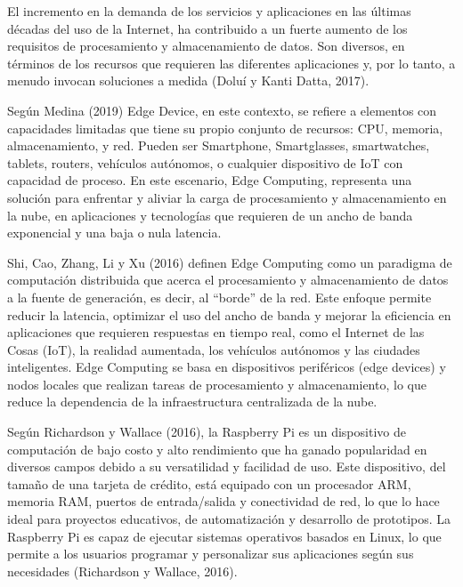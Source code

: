 

El incremento en la demanda de los servicios y aplicaciones en las últimas décadas del uso de la Internet, ha contribuido a un fuerte aumento de los requisitos de procesamiento y almacenamiento de datos.  Son diversos, en términos de los recursos que requieren las diferentes aplicaciones y, por lo tanto, a menudo invocan soluciones a medida (Doluí y Kanti Datta, 2017).

Según Medina (2019) Edge Device, en este contexto, se refiere a elementos con capacidades limitadas que tiene su propio conjunto de recursos: CPU, memoria, almacenamiento, y red. Pueden ser Smartphone, Smartglasses, smartwatches, tablets, routers, vehículos autónomos, o cualquier dispositivo de IoT con capacidad de proceso. En este escenario, Edge Computing, representa una solución para enfrentar y aliviar la carga de procesamiento y almacenamiento en la nube, en aplicaciones y tecnologías que requieren de un ancho de banda exponencial y una baja o nula latencia.

Shi, Cao, Zhang, Li y Xu (2016) definen Edge Computing como un paradigma de computación distribuida que acerca el procesamiento y almacenamiento de datos a la fuente de generación, es decir, al ``borde'' de la red. Este enfoque permite reducir la latencia, optimizar el uso del ancho de banda y mejorar la eficiencia en aplicaciones que requieren respuestas en tiempo real, como el Internet de las Cosas (IoT), la realidad aumentada, los vehículos autónomos y las ciudades inteligentes. Edge Computing se basa en dispositivos periféricos (edge devices) y nodos locales que realizan tareas de procesamiento y almacenamiento, lo que reduce la dependencia de la infraestructura centralizada de la nube.



Según Richardson y Wallace (2016), la Raspberry Pi es un dispositivo de computación de bajo costo y alto rendimiento que ha ganado popularidad en diversos campos debido a su versatilidad y facilidad de uso. Este dispositivo, del tamaño de una tarjeta de crédito, está equipado con un procesador ARM, memoria RAM, puertos de entrada/salida y conectividad de red, lo que lo hace ideal para proyectos educativos, de automatización y desarrollo de prototipos. La Raspberry Pi es capaz de ejecutar sistemas operativos basados en Linux, lo que permite a los usuarios programar y personalizar sus aplicaciones según sus necesidades (Richardson y Wallace, 2016).

